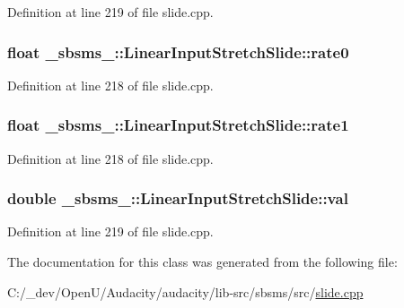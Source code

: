 Definition at line 219 of file slide.\+cpp.

\subsubsection[{\texorpdfstring{rate0}{rate0}}]{\setlength{\rightskip}{0pt plus 5cm}float \+\_\+sbsms\+\_\+\+::\+Linear\+Input\+Stretch\+Slide\+::rate0\hspace{0.3cm}{\ttfamily [protected]}}\hypertarget{class__sbsms___1_1_linear_input_stretch_slide_ae0200a4c98938e77f57ef34a1d03c34f}{}\label{class__sbsms___1_1_linear_input_stretch_slide_ae0200a4c98938e77f57ef34a1d03c34f}


Definition at line 218 of file slide.\+cpp.

\subsubsection[{\texorpdfstring{rate1}{rate1}}]{\setlength{\rightskip}{0pt plus 5cm}float \+\_\+sbsms\+\_\+\+::\+Linear\+Input\+Stretch\+Slide\+::rate1\hspace{0.3cm}{\ttfamily [protected]}}\hypertarget{class__sbsms___1_1_linear_input_stretch_slide_ac1cf5c07b027eaa2e5b93d0c45e9821c}{}\label{class__sbsms___1_1_linear_input_stretch_slide_ac1cf5c07b027eaa2e5b93d0c45e9821c}


Definition at line 218 of file slide.\+cpp.

\subsubsection[{\texorpdfstring{val}{val}}]{\setlength{\rightskip}{0pt plus 5cm}double \+\_\+sbsms\+\_\+\+::\+Linear\+Input\+Stretch\+Slide\+::val\hspace{0.3cm}{\ttfamily [protected]}}\hypertarget{class__sbsms___1_1_linear_input_stretch_slide_a3f4a99ccea092cc67e5707db74458b89}{}\label{class__sbsms___1_1_linear_input_stretch_slide_a3f4a99ccea092cc67e5707db74458b89}


Definition at line 219 of file slide.\+cpp.



The documentation for this class was generated from the following file\+:\begin{DoxyCompactItemize}
\item 
C\+:/\+\_\+dev/\+Open\+U/\+Audacity/audacity/lib-\/src/sbsms/src/\hyperlink{slide_8cpp}{slide.\+cpp}\end{DoxyCompactItemize}
